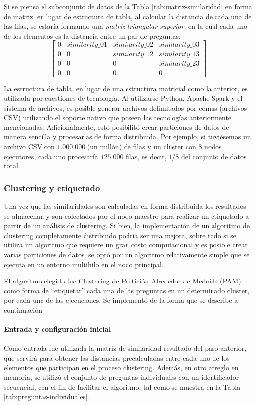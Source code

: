 Si se piensa el subconjunto de datos de la Tabla \ref{tab:matriz-similaridad} en forma de matriz, en lugar de estructura de tabla, al calcular la distancia de cada una de las filas, se estaría formando una \textit{matriz triangular superior}, en la cual cada uno de los elementos es la distancia entre un par de preguntas:
\[\begin{bmatrix}0 & similarity\_01 & similarity\_02 & similarity\_03 \\ 0 & 0 & similarity\_12 & similarity\_13  \\ 0 & 0  & 0 & similarity\_23  \\ 0 & 0 & 0 & 0 \end{bmatrix}\]

\bigskip La estructura de tabla, en lugar de una estructura matricial como la anterior, es utilizada por cuestiones de tecnología. Al utilizarse Python, Apache Spark y el sistema de archivos, es posible generar archivos delimitados por comas (archivos CSV) utilizando el soporte nativo que poseen las tecnologías anteriormente mencionadas. Adicionalmente, esto posibilitó crear particiones de datos de manera sencilla y procesarlas de forma distribuida. Por ejemplo, si tuviésemos un archivo CSV con \(1.000.000\) (un millón) de filas y un cluster con \(8\) nodos ejecutores, cada uno procesaría \(125.000\) filas, es decir, \(1/8\) del conjunto de datos total.

\subsubsection{Clustering y etiquetado}
Una vez que las similaridades son calculadas en forma distribuida los resultados se almacenan y son colectados por el nodo maestro para realizar un etiquetado a partir de un análisis de clustering. Si bien, la implementación de un algoritmo de clustering completamente distribuido podría ser una mejora, sobre todo si se utiliza un algoritmo que requiere un gran costo computacional y es posible crear varias particiones de datos, se optó por un algoritmo relativamente simple que se ejecuta en un entorno multihilo en el nodo principal.

\bigskip El algoritmo elegido fue Clustering de Partición Alrededor de Medoids (PAM) como forma de “etiquetar” cada una de las preguntas en un determinado cluster, por cada una de las ejecuciones. Se implementó de la forma que se describe a continuación.

\paragraph{Entrada y configuración inicial}
Como entrada fue utilizada la matriz de similaridad resultado del paso anterior, que servirá para obtener las distancias precalculadas entre cada uno de los elementos que participan en el proceso clustering. Además, en otro arreglo en memoria, se utilizó el conjunto de preguntas individuales con un identificador secuencial, con el fin de facilitar el algoritmo, tal como se muestra en la Tabla \ref{tab:preguntas-individuales}.

